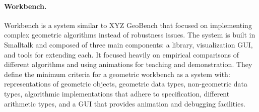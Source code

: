 \paragraph{Workbench.}

Workbench is a system similar to XYZ GeoBench that focused on implementing
complex geometric algorithms instead of robustness issues. The system is built
in Smalltalk and composed of three main components: a library, visualization
GUI, and tools for extending each. It focused heavily on empirical comparisons of different
algorithms and using animations for teaching and demonstration. They define the
minimum criteria for a geometric workbench as a system with: representations of
geometric objects, geometric data types, non-geometric data types, algorithmic
implementations that adhere to specification, different arithmetic types, and a
GUI that provides animation and debugging facilities.

% 

